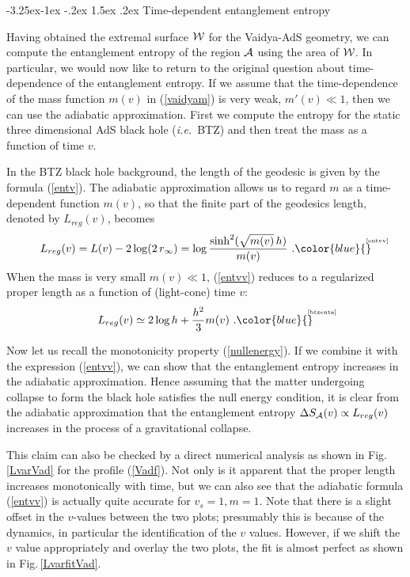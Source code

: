 \documentclass[12pt]{article}
\makeatletter
\renewcommand\subsection{\@startsection{subsection}{2}{\z@}%
                                     {-3.25ex\@plus -1ex \@minus -.2ex}%
                                     {1.5ex \@plus .2ex}%
                                     {\normalfont\bfseries}}
\newcommand{\be}{\begin{equation}}
\newcommand{\ee}{\end{equation}}
\def\fig#1{Fig.\,\ref{#1}}
\def\req#1{(\ref{#1})}
\def\ie{{\it i.e.}}
\def\D{\Delta}
\def\s{\sigma}
\def\CA{{\cal A}}
\def\CW{{\cal W}}
\def\f#1#2{{\frac{#1}{#2}}}
\def\f#1#2{{\frac{#1}{#2}}}
\def\Label#1{\label{#1}%
{ \color{blue}{\smash{\hbox to0pt{\raise2ex\hbox{\tiny[#1]}\hss}}}}}
\def\Gms{\CW}
\def\rA{\CA}
\def\s{\sqrt}
\def\f {\frac}
\makeatother
\begin{document}
\subsection{Time-dependent entanglement entropy}

Having obtained the extremal surface $\Gms$ for the Vaidya-AdS geometry, we can compute the entanglement entropy of the region $\rA$ using the area of $\Gms$.
In particular, we would now like to return to the original question about
time-dependence of the entanglement entropy. If we assume that the
time-dependence of the mass function $m(v)$ in \req{vaidyam} is very weak, $m'(v) \ll  1$, then we can use the adiabatic approximation. First we compute the
entropy for the static three dimensional AdS black hole (\ie\ BTZ) and
then treat the mass as a function of time $v$.

In the BTZ black hole background, the length of the geodesic is
given by the formula \req{entv}. The adiabatic approximation allows
us to regard $m$ as a time-dependent function $m(v)$, so that the
finite part of the geodesics length, denoted by $L_{reg}(v)$,
becomes
%
\be
L_{reg}(v) = L(v)-2\log(2\,r_{\infty})=\log\f{\sinh^2(\s{m(v)}\, h)}{m(v)} \ .
\Label{entvv} \ee
%
When the mass is very small $m(v)\ll 1$, \req{entvv} reduces to a regularized proper length as a function of (light-cone) time $v$:
%
\be L_{reg}(v)\simeq 2\log
h+\f{h^2}{3}m(v) \ . \Label{btzenta} \ee
%

Now let us recall the monotonicity property \req{nullenergy}. If
we combine it with the expression \req{entvv}, we can show that the
entanglement entropy increases in the adiabatic approximation. Hence assuming that the matter undergoing collapse to form the black hole satisfies the null energy condition, it is clear from the adiabatic approximation that the entanglement entropy
$\D S_\rA(v) \propto L_{reg}(v)$ increases in the process of a gravitational collapse.

This claim can also be checked by a direct numerical analysis as
shown in \fig{LvarVad} for the profile \req{Vadf}. Not
only is it apparent that the proper length increases monotonically with time,
but we can also see that the adiabatic formula (\ref{entvv}) is actually quite
accurate for $v_s=1, m=1$. Note that there is a slight offset in the
$v$-values between the two plots; presumably this is because of the
dynamics, in particular the identification of the $v$ values.
However, if we shift the $v$ value appropriately and overlay the two
plots, the fit is almost perfect as shown in \fig{LvarfitVad}.
\end{document}
